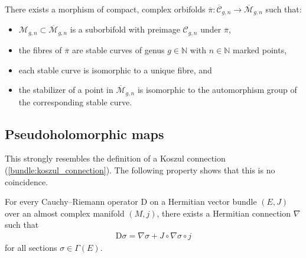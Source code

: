     \begin{property}\label{complex:deligne_mumford_compactification}
        There exists a morphism of compact, complex orbifolds $\overline{\pi}:\overline{\mathcal{C}}_{g,n}\rightarrow\overline{\mathcal{M}}_{g,n}$ such that:
        \begin{itemize}
            \item $\mathcal{M}_{g,n}\subset\overline{\mathcal{M}}_{g,n}$ is a suborbifold with preimage $\mathcal{C}_{g,n}$ under $\overline{\pi}$,
            \item the fibres of $\overline{\pi}$ are stable curves of genus $g\in\mathbb{N}$ with $n\in\mathbb{N}$ marked points,
            \item each stable curve is isomorphic to a unique fibre, and
            \item the stabilizer of a point in $\overline{\mathcal{M}}_{g,n}$ is isomorphic to the automorphism group of the corresponding stable curve.
        \end{itemize}
    \end{property}

\subsection{Pseudoholomorphic maps}\label{section:stable_maps}


    This strongly resembles the definition of a Koszul connection (\cref{bundle:koszul_connection}). The following property shows that this is no coincidence.
    \begin{property}
        For every Cauchy--Riemann operator $\mathrm{D}$ on a Hermitian vector bundle $(E,J)$ over an almost complex manifold $(M,j)$, there exists a Hermitian connection $\nabla$ such that
        \begin{gather}
            \mathrm{D}\sigma = \nabla\sigma + J\circ\nabla\sigma\circ j
        \end{gather}
        for all sections $\sigma\in\Gamma(E)$.
    \end{property}

